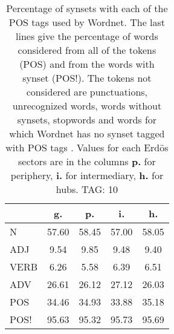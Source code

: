 \begin{table}[h!]
\begin{center}
\begin{tabular}{| l | c | c | c | c |}\hline
 & g. & p. & i. & h. \\\hline
N & 57.60  & 58.45  & 57.00  & 58.05 \\\hline
ADJ & 9.54  & 9.85  & 9.48  & 9.40 \\\hline
VERB & 6.26  & 5.58  & 6.39  & 6.51 \\\hline
ADV & 26.61  & 26.12  & 27.12  & 26.03 \\\hline
POS & 34.46  & 34.93  & 33.88  & 35.18 \\\hline
POS! & 95.63  & 95.32  & 95.73  & 95.69 \\\hline
\end{tabular}
\caption{Percentage of synsets with each of the POS tags used by Wordnet. The last lines give the percentage of words considered from all of the tokens (POS) and from the words with synset (POS!). The tokens not considered are punctuations, unrecognized words, words without synsets, stopwords and words for which Wordnet has no synset  tagged with POS tags . Values for each Erd\"os sectors are in the columns {{\bf p.}} for periphery, {{\bf i.}} for intermediary, {{\bf h.}} for hubs. TAG: 10}
\end{center}
\end{table}